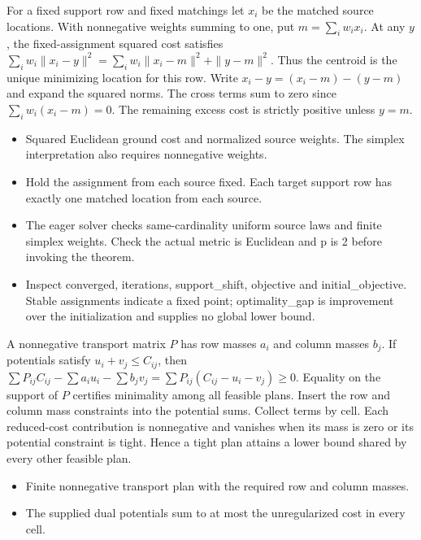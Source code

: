 \expandafter\def\csname statadic@statement@STATADIC-BARYCENTRE-001\endcsname{For a fixed support row and fixed matchings let $x_i$ be the
  matched source locations. With nonnegative weights summing to one, put
  $m=\sum_i w_i x_i$. At any $y$, the fixed-assignment squared cost satisfies
  $\sum_i w_i\|x_i-y\|^2=\sum_i w_i\|x_i-m\|^2+\|y-m\|^2$.
  Thus the centroid is the unique minimizing location for this row.}
\expandafter\def\csname statadic@proof@STATADIC-BARYCENTRE-001\endcsname{Write $x_i-y=(x_i-m)-(y-m)$ and expand the squared norms.
  The cross terms sum to zero since $\sum_i w_i(x_i-m)=0$.
  The remaining excess cost is strictly positive unless $y=m$.}
\expandafter\def\csname statadic@assumptions@STATADIC-BARYCENTRE-001\endcsname{\begin{itemize}
\item Squared Euclidean ground cost and normalized source weights. The simplex interpretation also requires nonnegative weights.
\item Hold the assignment from each source fixed. Each target support row has exactly one matched location from each source.
\end{itemize}}
\expandafter\def\csname statadic@diagnostics@STATADIC-BARYCENTRE-001\endcsname{\begin{itemize}
\item The eager solver checks same-cardinality uniform source laws and finite simplex weights. Check the actual metric is Euclidean and p is 2 before invoking the theorem.
\item Inspect converged, iterations, support\_shift, objective and initial\_objective. Stable assignments indicate a fixed point; optimality\_gap is improvement over the initialization and supplies no global lower bound.
\end{itemize}}
\expandafter\def\csname statadic@statement@STATADIC-TRANSPORT-001\endcsname{A nonnegative transport matrix $P$ has row masses $a_i$ and
  column masses $b_j$. If potentials satisfy $u_i+v_j\le C_{ij}$, then
  $\sum P_{ij}C_{ij}-\sum a_iu_i-\sum b_jv_j=
  \sum P_{ij}(C_{ij}-u_i-v_j)\ge0$.
  Equality on the support of $P$ certifies minimality among all feasible plans.}
\expandafter\def\csname statadic@proof@STATADIC-TRANSPORT-001\endcsname{Insert the row and column mass constraints into the potential sums.
  Collect terms by cell. Each reduced-cost contribution is nonnegative and vanishes
  when its mass is zero or its potential constraint is tight. Hence a tight plan
  attains a lower bound shared by every other feasible plan.}
\expandafter\def\csname statadic@assumptions@STATADIC-TRANSPORT-001\endcsname{\begin{itemize}
\item Finite nonnegative transport plan with the required row and column masses.
\item The supplied dual potentials sum to at most the unregularized cost in every cell.
\end{itemize}}
